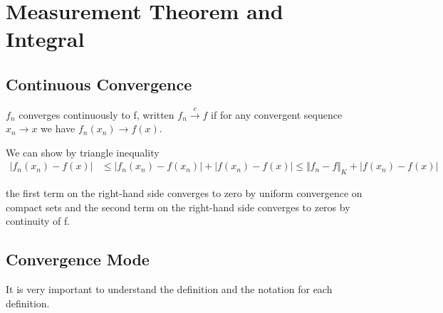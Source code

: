 \section{Measurement Theorem and Integral}

\subsection{Continuous Convergence}


\begin{Definition}
$f_n$ converges continuously to f, written $f_n \xrightarrow {c} f$ if for any convergent sequence $x_n \rightarrow x$ we have $f_n(x_n) \rightarrow f(x)$.

We can show by triangle inequality
\begin{align*}
	| f_n(x_n) - f(x)| & \leq |f_n(x_n) - f(x_n)| + |f(x_n) - f(x)| \leq \Vert f_n - f \Vert_K + |f(x_n) - f(x)|
\end{align*}

the first term on the right-hand side converges to zero by uniform convergence on compact sets and the second term on the right-hand side converges to zeros by continuity of f.

\end{Definition}

\subsection{Convergence Mode}
It is very important to understand the definition and the notation for each definition.


